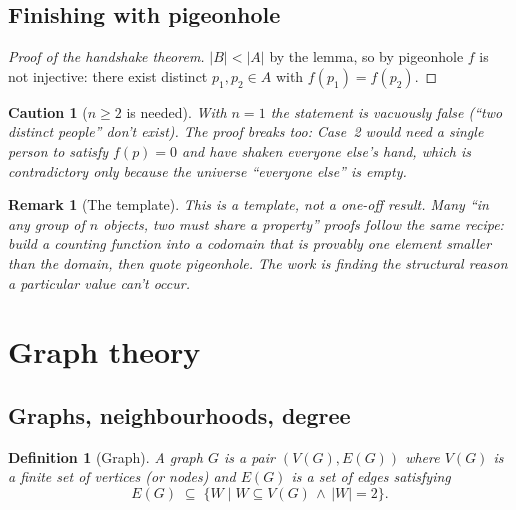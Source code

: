 \documentclass[11pt]{article}
\theoremstyle{defstyle}
\newtheorem{definition}{Definition}[section]
\theoremstyle{thmstyle}
\theoremstyle{notstyle}
\newtheorem*{remark}{Remark}
\theoremstyle{cautionstyle}
\newtheorem*{caution}{Caution}
\newcommand{\card}[1]{\lvert #1 \rvert}
\begin{document}
\subsection*{Finishing with pigeonhole}

\begin{proof}[Proof of the handshake theorem]
$\card{B} < \card{A}$ by the lemma, so by pigeonhole $f$ is not
injective: there exist distinct $p_1, p_2 \in A$ with $f(p_1) = f(p_2)$.
\end{proof}

\begin{cautionbox}
\begin{caution}[$n \geq 2$ is needed]
With $n = 1$ the statement is vacuously \emph{false} (``two distinct
people'' don't exist).  The proof breaks too: Case~2 would need a single
person to satisfy $f(p) = 0$ \emph{and} have shaken everyone else's hand,
which is contradictory only because the universe ``everyone else'' is empty.
\end{caution}
\end{cautionbox}

\begin{notebox}
\begin{remark}[The template]
This is a template, not a one-off result.  Many ``in any group of $n$
objects, two must share a property'' proofs follow the same recipe:
build a counting function into a codomain that is provably one element
smaller than the domain, then quote pigeonhole.  The work is finding the
structural reason a particular value can't occur.
\end{remark}
\end{notebox}

\section{Graph theory}\label{sec:graphs}

\subsection{Graphs, neighbourhoods, degree}

\begin{defbox}
\begin{definition}[Graph]
A \emph{graph} $G$ is a pair $(V(G), E(G))$ where $V(G)$ is a finite set
of \emph{vertices} (or \emph{nodes}) and $E(G)$ is a set of \emph{edges}
satisfying
\[
  E(G) \;\subseteq\; \bigl\{ W \mid W \subseteq V(G) \,\wedge\, \card{W} = 2 \bigr\}.
\]
\end{definition}
\end{defbox}
\end{document}

